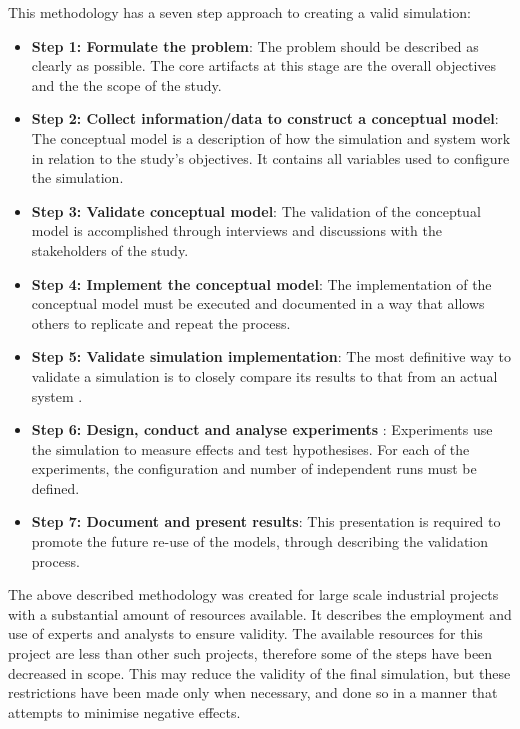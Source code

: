 This methodology has a seven step approach to creating a valid simulation:
\begin{itemize}
  \item \textbf{Step 1: Formulate the problem}: %
	The problem should be described as clearly as possible.
	The core artifacts at this stage are the overall objectives and the the scope of the study.
\item \textbf{Step 2: Collect information/data to construct a conceptual model}: %
	The conceptual model is a description of how the simulation and system work in relation to the study's objectives.
	It contains all variables used to configure the simulation. 
\item \textbf{Step 3: Validate conceptual model}: %
	The validation of the conceptual model is accomplished through interviews and discussions with the stakeholders of the study.
\item \textbf {Step 4: Implement the conceptual model}: %
	The implementation of the conceptual model must be executed and documented in a way that allows others to replicate and repeat the process.
\item \textbf{Step 5: Validate simulation implementation}: %
	The most definitive way to validate a simulation is to closely compare its results to that from an actual system \citep{Law2005}.
\item \textbf{Step 6: Design, conduct and analyse experiments} :
	Experiments use the simulation to measure effects and test hypothesises. 
	For each of the experiments, the configuration and number of independent runs must be defined.
\item \textbf{Step 7: Document and present results}:
	This presentation is required to promote the future re-use of the models, through describing the validation process.
\end{itemize}

The above described methodology was created for large scale industrial projects with a substantial amount of resources available.
It describes the employment and use of experts and analysts to ensure validity.
The available resources for this project are less than other such projects, therefore some of the steps have been decreased in scope.
This may reduce the validity of the final simulation, but these restrictions have been made only when necessary,
and done so in a manner that attempts to minimise negative effects.

